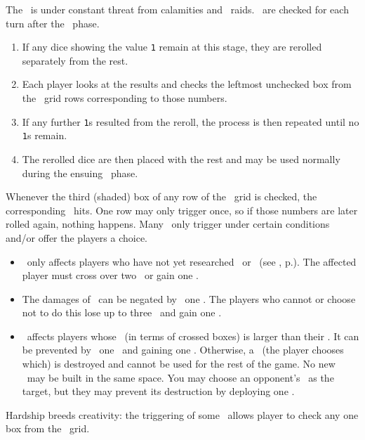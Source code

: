 The \planet\ is under constant threat from calamities and \pirate\ raids.  \disasters\ are checked for each turn after the \diplomacy\ phase.
\begin{enumerate}
  \item If any dice showing the value \texttt{1} remain at this stage, they are rerolled separately from the rest.
  \item Each player looks at the results and checks the leftmost unchecked box from the \disaster\ grid rows corresponding to those numbers.
  \item If any further \texttt{1}s resulted from the reroll, the process is then repeated until no \texttt{1}s remain.
  \item The rerolled dice are then placed with the rest and may be used normally during the ensuing \development\ phase.
\end{enumerate}
Whenever the third (shaded) box of any row of the \disaster\ grid is checked, the corresponding \disaster\ hits.  One row may only trigger once, so if those numbers are later rolled again, nothing happens.
\newline\newline
Many \disasters\ only trigger under certain conditions and/or offer the players a choice.
\begin{itemize}
  \item \terrorism\ only affects players who have not yet researched \shields\ or \lasers\ (see , p.\pageref{sec:disasters}). The affected player must cross over two \population\ or gain one \unhappiness.
  \item The damages of \war\ can be negated by \deploying\ one \squadron.  The players who cannot or choose not to do this lose up to three \currency\ and gain one \unhappiness.
  \item \terrorism\ affects players whose \unhappiness\ (in terms of crossed boxes) is larger than their \happiness.  It can be prevented by \deploying\ one \squadron\ and gaining one \unhappiness.  Otherwise, a \fortification\ (the player chooses which) is destroyed and cannot be used for the rest of the game.  No new \fortifications\ may be built in the same space.  You may choose an opponent’s \battleship\ as the target, but they may prevent its destruction by deploying one \squadron.
\end{itemize}
Hardship breeds creativity: the triggering of some \disasters\ allows player to check any one box from the \culture\ grid.
